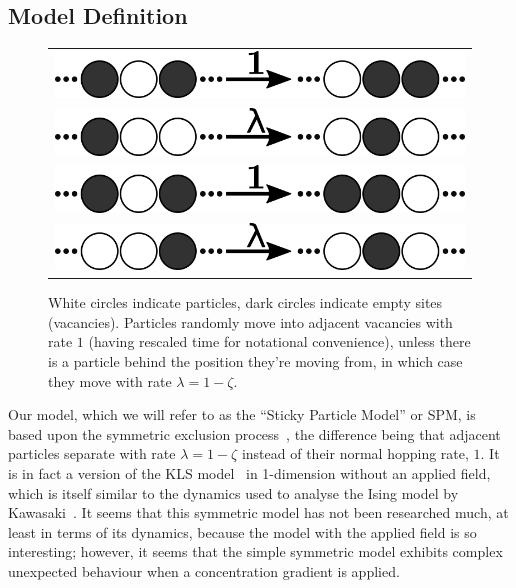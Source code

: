 \subsection{Model Definition}
\begin{figure}
\vspace{1em}
\caption{\label{fig:rates} White circles indicate particles, dark circles indicate empty sites (vacancies). Particles randomly move into adjacent vacancies with rate $1$ (having rescaled time for notational convenience), unless there is a
particle behind the position they're moving from, in which case they move with rate $\lambda=1-\zeta$.}
 \begin{tabular}{c}
    \includegraphics[width=\linewidth]{../tex-src/images/rateDiags/freeLeft} \\
    \includegraphics[width=\linewidth]{../tex-src/images/rateDiags/stickLeft} \\
    \includegraphics[width=\linewidth]{../tex-src/images/rateDiags/freeRight} \\
    \includegraphics[width=\linewidth]{../tex-src/images/rateDiags/stickRight} \\
    \end{tabular}
    \vspace{-1em}
\end{figure}

Our model, which we will refer to as the ``Sticky Particle Model'' or SPM, is based upon the symmetric exclusion process~\cite{sugden2007dynamically, Kollmann2003,  Lin2005, Hegde2014, Krapivsky2014, Imamura2017},
the difference being that adjacent particles separate with rate $\lambda=1-\zeta$
instead of their normal hopping rate, $1$. It is in fact a version of the KLS model~\cite{Katz1984, Zia2010} in 1-dimension without an applied field, which is itself similar to the dynamics used to analyse the Ising model by
Kawasaki~\cite{PhysRev.145.224}. It seems that this symmetric model has not been researched much, at least in terms of its dynamics, because the model with the applied field is so interesting; however, it seems that the simple symmetric model
exhibits complex unexpected behaviour when a concentration gradient is applied.

